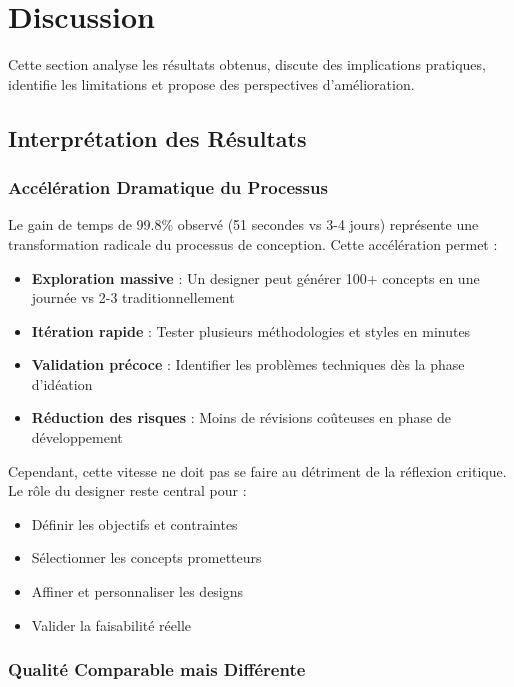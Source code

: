 \section{Discussion}

Cette section analyse les résultats obtenus, discute des implications pratiques, identifie les limitations et propose des perspectives d'amélioration.

\subsection{Interprétation des Résultats}

\subsubsection{Accélération Dramatique du Processus}

Le gain de temps de 99.8\% observé (51 secondes vs 3-4 jours) représente une transformation radicale du processus de conception. Cette accélération permet :

\begin{itemize}[leftmargin=*]
    \item \textbf{Exploration massive} : Un designer peut générer 100+ concepts en une journée vs 2-3 traditionnellement
    \item \textbf{Itération rapide} : Tester plusieurs méthodologies et styles en minutes
    \item \textbf{Validation précoce} : Identifier les problèmes techniques dès la phase d'idéation
    \item \textbf{Réduction des risques} : Moins de révisions coûteuses en phase de développement
\end{itemize}

Cependant, cette vitesse ne doit pas se faire au détriment de la réflexion critique. Le rôle du designer reste central pour :
\begin{itemize}[leftmargin=*]
    \item Définir les objectifs et contraintes
    \item Sélectionner les concepts prometteurs
    \item Affiner et personnaliser les designs
    \item Valider la faisabilité réelle
\end{itemize}

\subsubsection{Qualité Comparable mais Différente}

